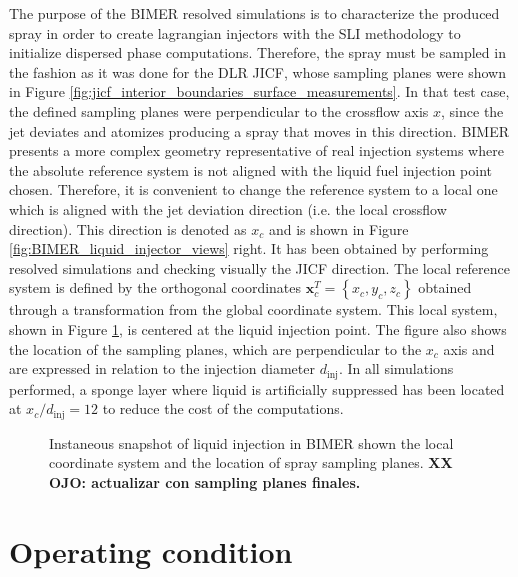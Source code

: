 The purpose of the BIMER resolved simulations is to characterize the produced spray in order to create lagrangian injectors with the SLI methodology to initialize dispersed phase computations. Therefore, the spray must be sampled in the fashion as it was done for the DLR JICF, whose sampling planes were shown in Figure \ref{fig:jicf_interior_boundaries_surface_measurements}. In that test case, the defined sampling planes were perpendicular to the crossflow axis $x$, since the jet deviates and atomizes producing a spray that moves in this direction. BIMER presents a more complex geometry representative of real injection systems where the absolute reference system is not aligned with the liquid fuel injection point chosen. Therefore, it is convenient to change the reference system to a local one which is aligned with the jet deviation direction (i.e. the local crossflow direction). This direction is denoted as $x_c$ and is shown in Figure \ref{fig:BIMER_liquid_injector_views} right. It has been obtained by performing resolved simulations and checking visually the JICF direction. The local reference system is defined by the orthogonal coordinates $\textbf{x}_c^T =\left\lbrace x_c, y_c, z_c \right\rbrace$ obtained through a transformation from the global coordinate system. This local system, shown in Figure \ref{fig:BIMER_local_FoR_and_sampling_planes}, is centered at the liquid injection point. The figure also shows the location of the sampling planes, which are perpendicular to the $x_c$ axis and are expressed in relation to the injection diameter $d_\mathrm{inj}$. In all simulations performed, a sponge layer where liquid is artificially suppressed has been located at $x_c/d_\mathrm{inj} = 12$ to reduce the cost of the computations.

\begin{figure}[h!]
	\centering
	\vspace*{-0.5in}
	\caption{Instaneous snapshot of liquid injection in BIMER shown the local coordinate system and the location of spray sampling planes. \textbf{XX OJO: actualizar con sampling planes finales.}}
	\label{fig:BIMER_local_FoR_and_sampling_planes}
\end{figure}


\section{Operating condition}
\label{sec:ch8_BIMER_operating_condition}

